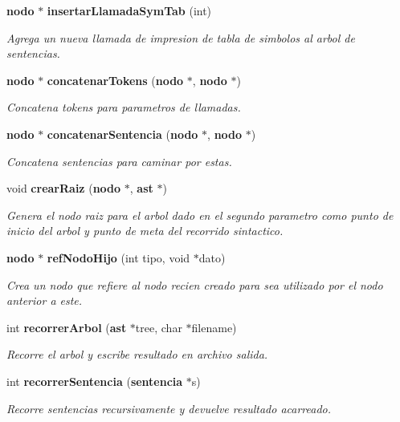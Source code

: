 \begin{CompactItemize}
{\bf nodo} $\ast$ {\bf insertar\-Llamada\-Sym\-Tab} (int)
\begin{CompactList}\small\item\em Agrega un nueva llamada de impresion de tabla de simbolos al arbol de sentencias. \item\end{CompactList}\item 
{\bf nodo} $\ast$ {\bf concatenar\-Tokens} ({\bf nodo} $\ast$, {\bf nodo} $\ast$)
\begin{CompactList}\small\item\em Concatena tokens para parametros de llamadas. \item\end{CompactList}\item 
{\bf nodo} $\ast$ {\bf concatenar\-Sentencia} ({\bf nodo} $\ast$, {\bf nodo} $\ast$)
\begin{CompactList}\small\item\em Concatena sentencias para caminar por estas. \item\end{CompactList}\item 
void {\bf crear\-Raiz} ({\bf nodo} $\ast$, {\bf ast} $\ast$)
\begin{CompactList}\small\item\em Genera el nodo raiz para el arbol dado en el segundo parametro como punto de inicio del arbol y punto de meta del recorrido sintactico. \item\end{CompactList}\item 
{\bf nodo} $\ast$ {\bf ref\-Nodo\-Hijo} (int tipo, void $\ast$dato)
\begin{CompactList}\small\item\em Crea un nodo que refiere al nodo recien creado para sea utilizado por el nodo anterior a este. \item\end{CompactList}\item 
int {\bf recorrer\-Arbol} ({\bf ast} $\ast$tree, char $\ast$filename)
\begin{CompactList}\small\item\em Recorre el arbol y escribe resultado en archivo salida. \item\end{CompactList}\item 
int {\bf recorrer\-Sentencia} ({\bf sentencia} $\ast$s)
\begin{CompactList}\small\item\em Recorre sentencias recursivamente y devuelve resultado acarreado. \item\end{CompactList}\item 

\end{CompactItemize}
